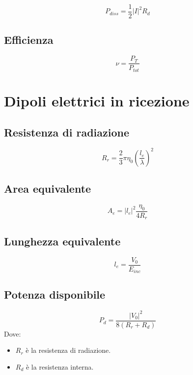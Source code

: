\documentclass[10pt,a4paper]{report}
\begin{document}
	  \begin{equation}
	  P_{diss}=\frac{1}{2}|I|^2R_d
	  \end{equation}

	  \subsection{Efficienza}

	  	\begin{equation}
		\nu=\frac{P_{T}}{P_{tot}}
	  	\end{equation}


		\section{Dipoli elettrici in ricezione}

			\subsection{Resistenza di radiazione}			
				\begin{equation}
				R_r=\frac{2}{3}\pi\eta_0(\frac{l_e}{\lambda})^2
				\end{equation}

			\subsection{Area equivalente}			
				\begin{equation}
				A_e=|l_e|^2\frac{\eta_0}{4R_r}
				\end{equation}

			\subsection{Lunghezza equivalente}			
				\begin{equation}
				l_e=\frac{V_0}{E_{inc}}
				\label{eq:lunghezza-equivalente}
				\end{equation}

			\subsection{Potenza disponibile}			
				\begin{equation}
			P_d=\frac{|V_0|^2}{8(R_r+R_d)}
				\end{equation}
			Dove:

			\begin{itemize}
			\item $R_r$ è la resistenza di radiazione.
			\item $R_d$ è la resistenza interna.
			\end{itemize}
			
\end{document}
